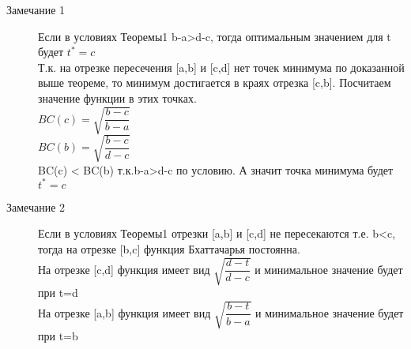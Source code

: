 \documentclass[12 pt, russian]{article}
\begin{document}
\begin{description}
\item[Замечание 1]
Если в условиях Теоремы1 b-a>d-c, тогда оптимальным значением для t будет $t^*=c$\\
Т.к. на отрезке пересечения [a,b] и [c,d] нет точек минимума по доказанной выше теореме, то минимум достигается в краях отрезка [c,b]. Посчитаем значение функции в этих точках.\\
$BC(c) = \sqrt{\dfrac{b-c}{b-a}}$\\
$BC(b) = \sqrt{\dfrac{b-c}{d-c}}$\\
BC(c) < BC(b) т.к.b-a>d-c по условию. А значит точка минимума будет $t^* = c$

\end{description}

\begin{description}
\item[Замечание 2]
Если в условиях Теоремы1 отрезки [a,b] и [c,d] не пересекаются т.е. b<c, тогда на отрезке [b,c] функция Бхаттачарья постоянна. \\
На отрезке [c,d] функция имеет вид $\sqrt{\dfrac{d-t}{d-c}}$ и минимальное значение будет при t=d\\
На отрезке [a,b] функция имеет вид $\sqrt{\dfrac{b-t}{b-a}}$ и минимальное значение будет при t=b

\end{description}
\end{document}
